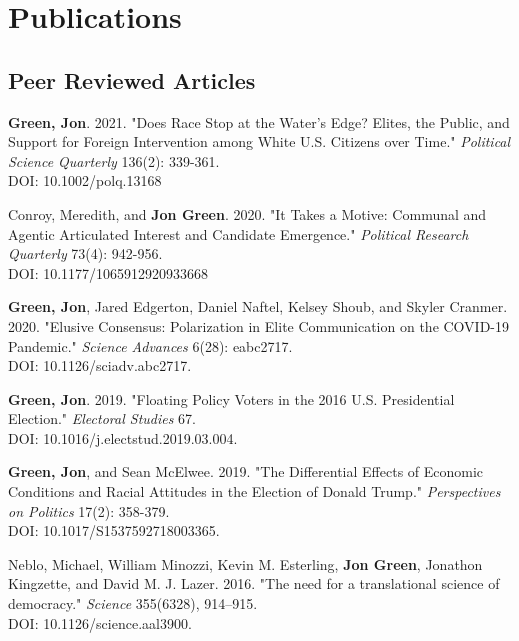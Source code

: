 \documentclass[letterpaper]{article}
\renewenvironment{itemize}{
  \begin{list}{}{
    \setlength{\leftmargin}{1.5em}
  }
}{
  \end{list}
}
\begin{document}
\section*{Publications}

\subsection*{Peer Reviewed Articles}

\begin{itemize}

\item \textbf{Green, Jon}. 2021. "Does Race Stop at the Water's Edge? Elites, the Public, and Support for Foreign Intervention among White U.S. Citizens over Time." \textit{Political Science Quarterly} 136(2): 339-361. \\
DOI: 10.1002/polq.13168

\item Conroy, Meredith, and \textbf{Jon Green}. 2020. "It Takes a Motive: Communal and Agentic Articulated Interest and Candidate Emergence."  \textit{Political Research Quarterly} 73(4): 942-956. \\
DOI: 10.1177/1065912920933668

\item \textbf{Green, Jon}, Jared Edgerton, Daniel Naftel, Kelsey Shoub, and Skyler Cranmer. 2020. "Elusive Consensus: Polarization in Elite Communication on the COVID-19 Pandemic." \textit{Science Advances} 6(28): eabc2717. \\
DOI: 10.1126/sciadv.abc2717.

\item \textbf{Green, Jon}. 2019. "Floating Policy Voters in the 2016 U.S. Presidential Election." \textit{Electoral Studies} 67. \\
DOI: 10.1016/j.electstud.2019.03.004.

\item \textbf{Green, Jon}, and Sean McElwee. 2019. "The Differential Effects of Economic Conditions and Racial Attitudes in the Election of Donald Trump." \textit{Perspectives on Politics} 17(2): 358-379. \\
DOI: 10.1017/S1537592718003365.

\item Neblo, Michael, William Minozzi, Kevin M. Esterling, \textbf{Jon Green}, Jonathon Kingzette, and David M. J. Lazer. 2016. "The need for a translational science of democracy." \textit{Science} 355(6328), 914--915.\\
DOI: 10.1126/science.aal3900.
\end{itemize}
\end{document}
